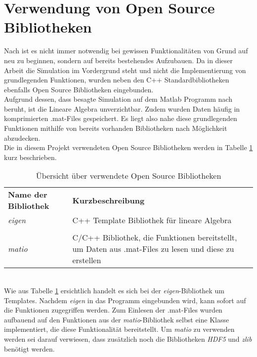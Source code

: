 \section{Verwendung von Open Source Bibliotheken}
\label{sec:OSBib}
Nach  \cite{Kessler.Wintersemester201718}  ist es nicht immer notwendig bei gewissen Funktionalitäten von Grund auf neu zu beginnen, sondern auf bereits bestehendes Aufzubauen.
Da in dieser Arbeit die Simulation im Vordergrund steht und nicht die Implementierung von grundlegenden Funktionen, wurden neben den C++ Standardbibliotheken ebenfalls Open Source Bibliotheken eingebunden.\\ Aufgrund dessen, dass besagte Simulation auf dem Matlab Programm nach \cite{Olucak.15.02.2017} beruht, ist die Lineare Algebra unverzichtbar. Zudem wurden Daten häufig in komprimierten .mat-Files gespeichert. Es liegt also nahe diese grundlegenden Funktionen mithilfe von bereits vorhanden Bibliotheken nach Möglichkeit abzudecken.
\\Die in diesem Projekt verwendeten Open Source Bibliotheken werden in Tabelle \ref{tab:openSource} kurz beschrieben.
\begin{table}[h]
	\centering	\begin{tabular}{l p{10cm}}
		\textbf{Name der Bibliothek} & \textbf{Kurzbeschreibung}\\
		 \textit{eigen} &  C++ Template Bibliothek für lineare Algebra \cite{TuxFamily.2018}\\\\
		 \textit{matio} & C/C++ Bibliothek, die Funktionen bereitstellt, um Daten aus .mat-Files zu lesen und diese zu erstellen \cite{Hulbert.2013}
	\end{tabular}
	\caption{Übersicht über verwendete Open Source Bibliotheken}
	\label{tab:openSource}
\end{table}\\
Wie aus Tabelle \ref{tab:openSource} ersichtlich handelt es sich bei der  \textit{eigen}-Bibliothek um Templates. Nachdem  \textit{eigen} in das Programm eingebunden wird, kann sofort auf die Funktionen zugegriffen werden. Zum Einlesen der .mat-Files wurden aufbauend auf den  Funktionen aus der  \textit{matio}-Bibliothek selbst eine Klasse implementiert, die diese Funktionalität bereitstellt. Um  \textit{matio} zu verwenden werden sei darauf verwiesen, dass zusätzlich noch die Bibliotheken  \textit{HDF5} \cite{HDFGroup.2018} und  \textit{zlib} \cite{Roelofs.2018} benötigt werden. 



